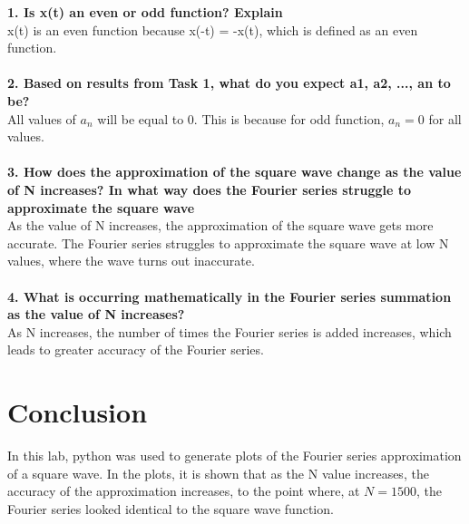 \documentclass[12pt]{report}
\begin{document}
\textbf{1. Is x(t) an even or odd function? Explain}
\\x(t) is an even function because x(-t) = -x(t), which is defined as an even function.
\\
\\ \textbf{2. Based on results from Task 1, what do you expect a1, a2, ..., an to be?}
\\All values of $a_n$ will be equal to 0. This is because for odd function, $a_n = 0$ for all values.
\\
\\ \textbf{3. How does the approximation of the square wave change as the value of N increases? In what way does the Fourier series struggle to approximate the square wave}
\\As the value of N increases, the approximation of the square wave gets more accurate. The Fourier series struggles to approximate the square wave at low N values, where the wave turns out inaccurate.
\\
\\ \textbf{4. What is occurring mathematically in the Fourier series summation as the value of N increases?}
\\As N increases, the number of times the Fourier series is added increases, which leads to greater accuracy of the Fourier series.

\section{Conclusion}
In this lab, python was used to generate plots of the Fourier series approximation of a square wave. In the plots, it is shown that as the N value increases, the accuracy of the approximation increases, to the point where, at $N = 1500$, the Fourier series looked identical to the square wave function.
\end{document}

